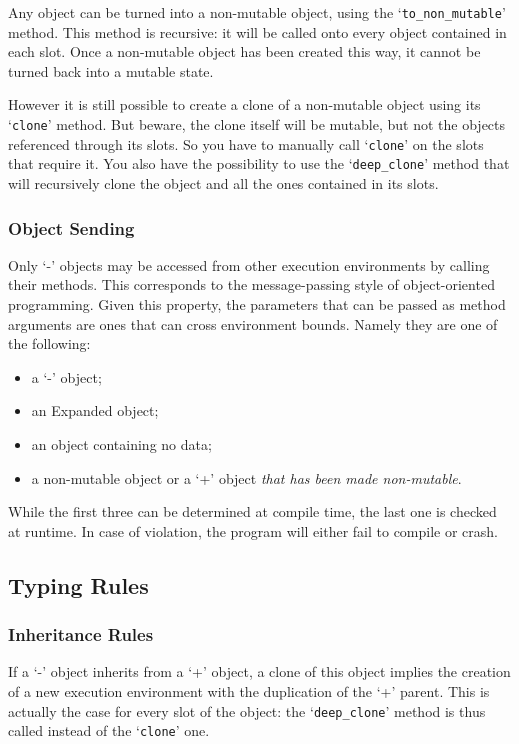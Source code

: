 \documentclass[11pt]{mybook}
\begin{document}
Any object can be turned into a non-mutable object, using the
`\verb!to_non_mutable!' method.  This method is recursive: it will be
called onto every object contained in each slot.  Once a non-mutable
object has been created this way, it cannot be turned back into a
mutable state. 

However it is still possible to create a clone of a non-mutable object
using its `\verb!clone!' method.  But beware, the clone itself will be
mutable, but not the objects referenced through its slots.  So you
have to manually call `\verb!clone!' on the slots that require it.
You also have the possibility to use the `\verb!deep_clone!' method
that will recursively clone the object and all the ones contained in
its slots. 

\subsubsection{Object Sending}

Only `-' objects may be accessed from other execution environments by
calling their methods.  This corresponds to the message-passing style
of object-oriented programming.  Given this property, the parameters
that can be passed as method arguments are ones that can cross
environment bounds.  Namely they are one of the following: 
\begin{itemize}
  \item a `-' object;
  \item an Expanded object;
  \item an object containing no data;
  \item a non-mutable object or a `+' object \emph{that has been made
  non-mutable}. 
\end{itemize}

While the first three can be determined at compile time, the last one
is checked at runtime.  In case of violation, the program will either
fail to compile or crash. 

\subsection{Typing Rules}

\subsubsection{Inheritance Rules}

If a `-' object inherits from a `+' object, a clone of this object
implies the creation of a new execution environment with the
duplication of the `+' parent.  This is actually the case for every
slot of the object: the `\verb!deep_clone!' method is thus called
instead of the `\verb!clone!' one. 
\end{document}
